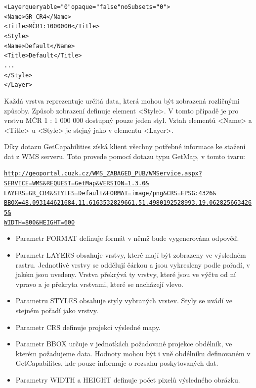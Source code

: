 \documentclass[a4paper,12pt]{article}
\begin{document}
\begin{alltt}\footnotesize
<Layer queryable="0" opaque="false" noSubsets="0">
    <Name>GR_CR4</Name>
    <Title>MČR 1 : 1 000 000</Title>
    <Style>
        <Name>Default</Name>
        <Title>Default</Title>
          ...
    </Style>
</Layer>
\end{alltt}


Každá vrstva reprezentuje určitá data, která mohou být zobrazená
rozličnými způsoby. Způsob zobrazení definuje element <Style>. V tomto
případě je pro vrstvu MČR 1 : 1 000 000 dostupný pouze jeden
styl. Vztah elementů <Name> a <Title> u <Style> je stejný jako v
elementu <Layer>.

Díky dotazu GetCapabilities získá klient všechny potřebné informace ke
stažení dat z WMS serveru.  Toto provede pomocí dotazu typu GetMap, v
tomto tvaru:

\newcommand{\CUZKgetMap}{http://geoportal.cuzk.cz/WMS_ZABAGED_PUB/WMService.aspx?SERVICE=WMS&REQUEST=GetMap&VERSION=1.3.0&LAYERS=GR_CR4&STYLES=Default&FORMAT=image/png&CRS=EPSG:4326&BBOX=48.093144621684,11.6163532829661,51.4980192528993,19.0628256634265&WIDTH=800&HEIGHT=600}
\begin{alltt}\footnotesize
\href{\CUZKgetMap}{http://geoportal.cuzk.cz/WMS\_ZABAGED\_PUB/WMService.aspx?}
\href{\CUZKgetMap}{SERVICE=WMS\&REQUEST=GetMap\&VERSION=1.3.0\&}
\href{\CUZKgetMap}{LAYERS=GR\_CR4\&STYLES=Default\&FORMAT=image/png\&CRS=EPSG:4326\&}
\href{\CUZKgetMap}{BBOX=48.093144621684,11.6163532829661,51.4980192528993,19.0628256634265\&}
\href{\CUZKgetMap}{WIDTH=800\&HEIGHT=600}
\end{alltt}


\begin{itemize}
  \item Parametr FORMAT definuje formát v němž bude vygenerována odpověď. 
  \item Parametr LAYERS obsahuje vrstvy, které mají být zobrazeny ve
    výsledném rastru. Jednotlivé vrstvy se oddělují čárkou a jsou
    vykresleny podle pořadí, v jakém jsou uvedeny. Vrstva překrývá ty
    vrstvy, které jsou ve výčtu od ní vpravo a je překryta vrstvami,
    které se nacházejí vlevo.
  \item Parametru STYLES obsahuje styly vybraných vrstev. Styly se
    uvádí ve stejném pořadí jako vrstvy.
  \item Parametr CRS definuje projekci výsledné mapy. 
  \item Parametr BBOX určuje v jednotkách požadované projekce
    obdélník, ve kterém požadujeme data. Hodnoty mohou být i vně
    obdélníku definovaném v GetCapabilites, kde pouze informuje o
    rozsahu poskytovaných dat.
  \item Parametry WIDTH a HEIGHT definuje počet pixelů výsledného
    obrázku.
\end{itemize}
\end{document}
